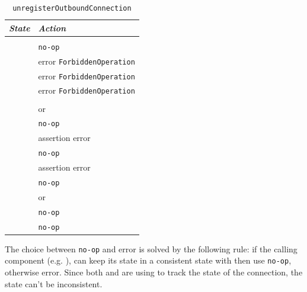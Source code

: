 \begin{table}
  \begin{tabular}[h]{ll}
    \textit{State}           & \textit{Action} \\\hline\\[2pt]
    \InitialState{}          & \texttt{no-op} \\[8pt]
    \ReservedOutboundState{} & error \texttt{ForbiddenOperation} \\[8pt]
    \UnnegotiatedStateOut{}  & error \texttt{ForbiddenOperation} \\[8pt]
    \UnnegotiatedStateIn{}   & error \texttt{ForbiddenOperation} \\[8pt]
    \OutboundStateAny{}      & \DemotedToColdAnyLoc{} \\[8pt]
    \OutboundStateDupTau{}   & \Prune{} or \DemotedToColdDupLoc{} \\[8pt]
    \OutboundIdleStateAny{}  & \texttt{no-op} \\[8pt]
    \InboundIdleStateUni{}   & assertion error \\[8pt]
    \InboundIdleStateDup{}   & \texttt{no-op} \\[8pt]
    \InboundStateUni{}       & assertion error \\[8pt]
    \InboundStateDup{}       & \texttt{no-op} \\[8pt]
    \DuplexState{}           & \Prune{} or \DemotedToColdDupLoc{} \\[8pt]
    \TerminatingState{}      & \texttt{no-op} \\[8pt]
    \TerminatedState{}       & \texttt{no-op} \\[8pt]
  \end{tabular}
  \caption{\texttt{unregisterOutboundConnection}}
  \label{table:unregisterOutboundConnection}
\end{table}

The choice between \texttt{no-op} and error is solved by the following rule: if
the calling component (e.g. \ptopgov{}), can keep its state in
a consistent state with \connmngr{} then use \texttt{no-op}, otherwise
error.  Since both \inbgov{} and \ptopgov{} are using \mux{} to track the state
of the connection, the state can't be inconsistent.

